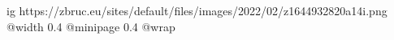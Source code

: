  
 
 
 
 

\ifcmt
  ig https://zbruc.eu/sites/default/files/images/2022/02/z1644932820a14i.png
  @width 0.4
  @minipage 0.4
  @wrap \parpic[r]
\fi
